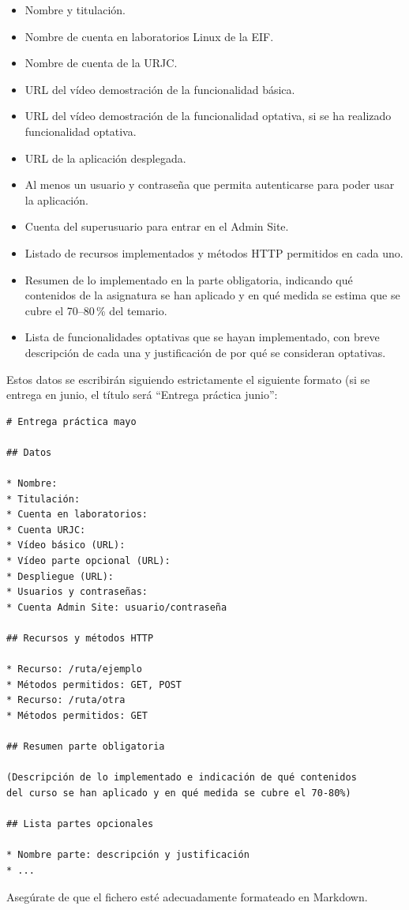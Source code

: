 \begin{itemize}
\begin{itemize}
  \item Nombre y titulación.
  \item Nombre de cuenta en laboratorios Linux de la EIF.
  \item Nombre de cuenta de la URJC.
  \item URL del vídeo demostración de la funcionalidad básica.
  \item URL del vídeo demostración de la funcionalidad optativa, si se ha realizado funcionalidad optativa.
  \item URL de la aplicación desplegada.
  \item Al menos un usuario y contraseña que permita autenticarse para poder usar la aplicación.
  \item Cuenta del superusuario para entrar en el Admin Site.
  \item Listado de recursos implementados y métodos HTTP permitidos en cada uno.
  \item Resumen de lo implementado en la parte obligatoria, indicando qué contenidos de la asignatura se han aplicado y en qué medida se estima que se cubre el 70--80\,\% del temario.
  \item Lista de funcionalidades optativas que se hayan implementado, con breve descripción de cada una y justificación de por qué se consideran optativas.
\end{itemize}

Estos datos se escribirán siguiendo estrictamente el siguiente formato (si se entrega en junio, el título será ``Entrega práctica junio'':

\begin{verbatim}
# Entrega práctica mayo

## Datos

* Nombre:
* Titulación:
* Cuenta en laboratorios:
* Cuenta URJC:
* Vídeo básico (URL):
* Vídeo parte opcional (URL):
* Despliegue (URL):
* Usuarios y contraseñas:
* Cuenta Admin Site: usuario/contraseña

## Recursos y métodos HTTP

* Recurso: /ruta/ejemplo
* Métodos permitidos: GET, POST
* Recurso: /ruta/otra
* Métodos permitidos: GET

## Resumen parte obligatoria

(Descripción de lo implementado e indicación de qué contenidos
del curso se han aplicado y en qué medida se cubre el 70-80%)

## Lista partes opcionales

* Nombre parte: descripción y justificación
* ...
\end{verbatim}

Asegúrate de que el fichero esté adecuadamente formateado en Markdown.
\end{itemize}


